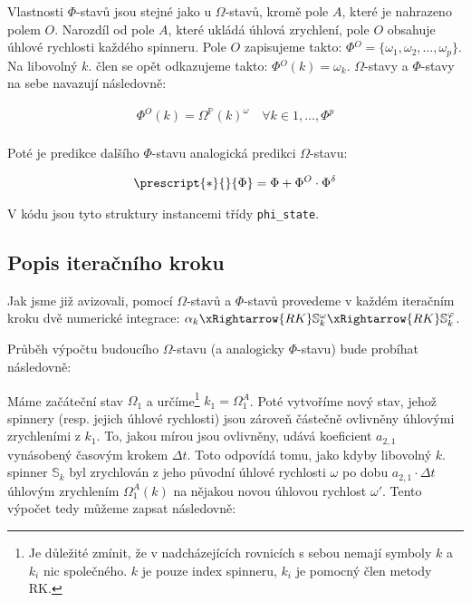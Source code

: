 Vlastnosti $\Phi$-stavů jsou stejné jako u $\Omega$-stavů, kromě pole $A$, které je nahrazeno polem $O$. Narozdíl od pole $A$, které ukládá úhlová zrychlení, pole $O$ obsahuje úhlové rychlosti každého spinneru. Pole $O$ zapisujeme takto: $\Phi{}^{O} = \{ \omega_1, \omega_2, \ldots, \omega_p\}$. Na libovolný $k$. člen se opět odkazujeme takto: $\Phi{}^{O}(k) = \omega_k$. $\Omega$-stavy a $\Phi$-stavy na sebe navazují následovně:

\begin{equation}
    \label{eq:sim_equations_formalized6}
    \begin{gathered}
        \Phi^O(k) = {\Omega}^{\mathbb{P}}(k)^{\omega}
        \quad
        \forall k \in {1, \ldots, \Phi^{p}} \\
    \end{gathered}
\end{equation}

Poté je predikce dalšího $\Phi$-stavu analogická predikci $\Omega$-stavu:

\begin{equation}
    \label{eq:sim_equations_formalized7}
    \begin{gathered}
        \prescript{*}{}{\Phi} = \Phi + \Phi^O \cdot \Phi^{\delta}
    \end{gathered}
\end{equation}

V kódu jsou tyto struktury instancemi třídy \texttt{phi\_state}.

\subsection{Popis iteračního kroku}

Jak jsme již avizovali, pomocí $\Omega$-stavů a $\Phi$-stavů provedeme v každém iteračním kroku dvě numerické integrace: $\alpha_k \xRightarrow{RK} \mathbb{S}_k^{\omega}  \xRightarrow{RK} \mathbb{S}_k^{\varphi}$.

Průběh výpočtu budoucího $\Omega$-stavu (a analogicky $\Phi$-stavu) bude probíhat následovně:

Máme začáteční stav $\Omega_1$ a určíme\footnote{Je důležité zmínit, že v nadcházejících rovnicích s sebou nemají symboly $k$ a $k_i$ nic společného. $k$ je pouze index spinneru, $k_i$ je pomocný člen metody RK.} $k_1 = \Omega_1^A$.
Poté vytvoříme nový stav, jehož spinnery (resp. jejich úhlové rychlosti) jsou zároveň částečně ovlivněny úhlovými zrychleními z $k_1$.
To, jakou mírou jsou ovlivněny, udává koeficient $a_{2, 1}$ vynásobený časovým krokem $\Delta t$.
Toto odpovídá tomu, jako kdyby libovolný $k$. spinner $\mathbb{S}_k$ byl zrychlován z jeho původní úhlové rychlosti $\omega$ po dobu $a_{2, 1} \cdot \Delta t$ úhlovým zrychlením $\Omega_1^A(k)$ na nějakou novou úhlovou rychlost $\omega'$.
Tento výpočet tedy můžeme zapsat následovně:


